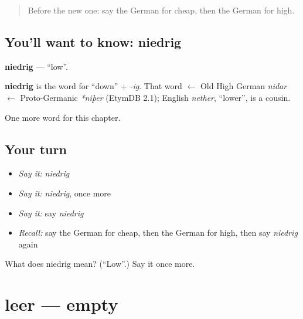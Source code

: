 \label{lesson:GE-C90-niedrig}



\begin{quote}
Before the new one: say the German for cheap, then the German for high.
\end{quote}

\subsection*{You'll want to know: niedrig}
\textbf{niedrig} — \textquotedblleft{}low\textquotedblright{}.

\begin{cousinweb}
\textbf{niedrig} is the word for \textquotedblleft{}down\textquotedblright{} + \emph{-ig}. That word $\leftarrow$ Old High German \emph{nidar} $\leftarrow$ Proto-Germanic \emph{*niþer} (EtymDB 2.1); English \emph{nether}, \textquotedblleft{}lower\textquotedblright{}, is a cousin.
\end{cousinweb}

\begin{grammarlens}[title={What you've built}]
One more word for this chapter.
\end{grammarlens}

\subsection*{Your turn}
\begin{itemize}
\raggedright
  \item \emph{Say it:} \emph{niedrig}
  \item \emph{Say it:} \emph{niedrig}, once more
  \item \emph{Say it:} say \emph{niedrig}
  \item \emph{Recall:} say the German for cheap, then the German for high, then say \emph{niedrig} again
\end{itemize}

\begin{tcolorbox}[breakable,colback=teal!4,colframe=teal!35!black,title={Before you move on}]
What does niedrig mean? (\textquotedblleft{}Low\textquotedblright{}.) Say it once more.
\end{tcolorbox}
\section[leer]{leer — empty}

\label{lesson:GE-C90-leer}



